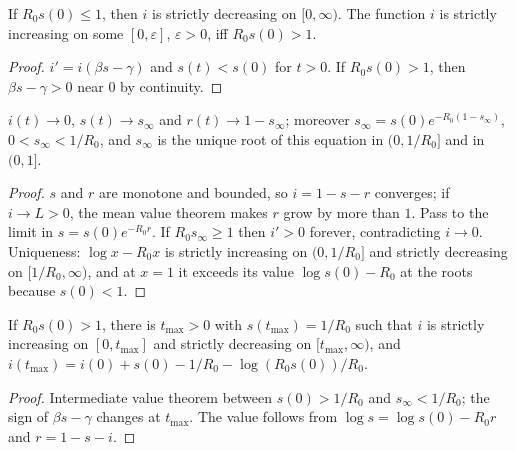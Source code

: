 \begin{theorem}[Threshold]\label{thm:km-threshold}
\leanok{}
If $R_0s(0)\le1$, then $i$ is strictly decreasing on $[0,\infty)$. The function $i$ is strictly
increasing on some $[0,\varepsilon]$, $\varepsilon>0$, iff $R_0s(0)>1$.
\end{theorem}
\begin{proof}\leanok
$i'=i(\beta s-\gamma)$ and $s(t)<s(0)$ for $t>0$. If $R_0s(0)>1$, then $\beta s-\gamma>0$ near $0$
by continuity.
\end{proof}

\begin{theorem}\label{thm:km-final}
\leanok{}
$i(t)\to0$, $s(t)\to s_\infty$ and $r(t)\to1-s_\infty$; moreover
$s_\infty=s(0)e^{-R_0(1-s_\infty)}$, $0<s_\infty<1/R_0$, and $s_\infty$ is the unique root of this
equation in $(0,1/R_0]$ and in $(0,1]$.
\end{theorem}
\begin{proof}\leanok
$s$ and $r$ are monotone and bounded, so $i=1-s-r$ converges; if $i\to L>0$, the mean value
theorem makes $r$ grow by more than $1$. Pass to the limit in $s=s(0)e^{-R_0r}$. If
$R_0s_\infty\ge1$ then $i'>0$ forever, contradicting $i\to0$. Uniqueness: $\log x-R_0x$ is strictly
increasing on $(0,1/R_0]$ and strictly decreasing on $[1/R_0,\infty)$, and at $x=1$ it exceeds its
value $\log s(0)-R_0$ at the roots because $s(0)<1$.
\end{proof}

\begin{theorem}[Peak]\label{thm:km-peak}
\leanok{}
If $R_0s(0)>1$, there is $t_{\max}>0$ with $s(t_{\max})=1/R_0$ such that $i$ is strictly
increasing on $[0,t_{\max}]$ and strictly decreasing on $[t_{\max},\infty)$, and
$i(t_{\max})=i(0)+s(0)-1/R_0-\log(R_0s(0))/R_0$.
\end{theorem}
\begin{proof}\leanok
Intermediate value theorem between $s(0)>1/R_0$ and $s_\infty<1/R_0$; the sign of $\beta s-\gamma$
changes at $t_{\max}$. The value follows from $\log s=\log s(0)-R_0r$ and $r=1-s-i$.
\end{proof}


